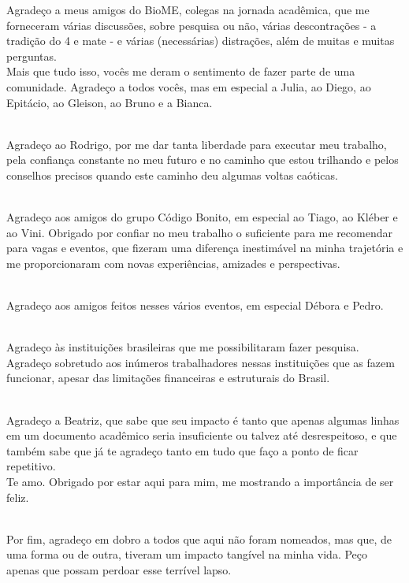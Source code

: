 \documentclass[
	12pt,				%
	oneside,			%
	a4paper,			%
	chapter=TITLE,		%
	section=TITLE,		%
	english,			%
	brazil				%
	]{abntex2}
\begin{document}
\begin{agradecimentos}
	Agradeço a meus amigos do BioME, colegas na jornada acadêmica, que me forneceram várias discussões, sobre pesquisa ou não, várias descontrações - a tradição do 4 e mate - e várias (necessárias) distrações, além de muitas e muitas perguntas.\\
Mais que tudo isso, vocês me deram o sentimento de fazer parte de uma comunidade. Agradeço a todos vocês, mas em especial a Julia, ao Diego, ao Epitácio, ao Gleison, ao Bruno e a Bianca.\\
\strut \\
Agradeço ao Rodrigo, por me dar tanta liberdade para executar meu trabalho, pela confiança constante no meu futuro e no caminho que estou trilhando e pelos conselhos precisos quando este caminho deu algumas voltas caóticas.\\
\strut \\
Agradeço aos amigos do grupo Código Bonito, em especial ao Tiago, ao Kléber e ao Vini. Obrigado por confiar no meu trabalho o suficiente para me recomendar para vagas e eventos, que fizeram uma diferença inestimável na minha trajetória e me proporcionaram com novas experiências, amizades e perspectivas.\\
\strut \\
Agradeço aos amigos feitos nesses vários eventos, em especial Débora e Pedro.\\
\strut \\
Agradeço às instituições brasileiras que me possibilitaram fazer pesquisa. Agradeço sobretudo aos inúmeros trabalhadores nessas instituições que as fazem funcionar, apesar das limitações financeiras e estruturais do Brasil.\\
\strut \\
Agradeço a Beatriz, que sabe que seu impacto é tanto que apenas algumas linhas em um documento acadêmico seria insuficiente ou talvez até desrespeitoso, e que também sabe que já te agradeço tanto em tudo que faço a ponto de ficar repetitivo.\\
Te amo. Obrigado por estar aqui para mim, me mostrando a importância de ser feliz.\\
\strut \\
Por fim, agradeço em dobro a todos que aqui não foram nomeados, mas que, de uma forma ou de outra, tiveram um impacto tangível na minha vida. Peço apenas que possam perdoar esse terrível lapso.
\end{agradecimentos}
\end{document}
